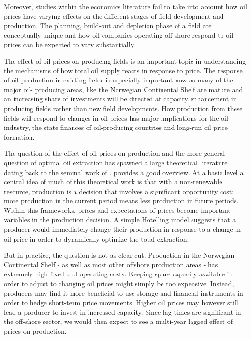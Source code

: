 \documentclass[12pt]{article}
\begin{document}
Moreover, studies within the economics literature fail to take into account how oil prices have varying effects on the different stages of field development and production.  The planning, build-out and depletion phase of a field are conceptually unique and how oil companies operating off-shore respond to oil prices can be expected to vary substantially.

The effect of oil prices on producing fields is an important topic in understanding the mechanisms of how total oil supply reacts in response to price. The response of oil production in existing fields is especially important now as many of the major oil- producing areas, like the Norwegian Continental Shelf are mature and an increasing share of investments will be directed at capacity enhancement in producing fields rather than new field developments. How production from these fields will respond to changes in oil prices has major implications for the oil industry, the state finances of oil-producing countries and long-run oil price formation.

The question of the effect of oil prices on production and the more general question of optimal oil extraction has spawned a large theoretical literature dating back to the seminal work of \citet{hotelling_economics_1931}. \citet{krautkraemer_nonrenewable_1998} provides a good overview. At a basic level a central idea of much of this theoretical work is that with a non-renewable resource, production is a decision that involves a significant opportunity cost: more production in the current period means less production in future periods.  Within this frameworks, prices and expectations of prices become important variables in the production decision. A simple Hotelling model suggests that a producer would immediately change their production in response to a change in oil price in order to dynamically optimize the total extraction.

But in practice, the question is not as clear cut.  Production in the Norwegian Continental Shelf - as well as most other offshore production areas - has extremely high fixed and operating costs.  Keeping spare capacity available in order to adjust to changing oil prices might simply be too expensive.  Instead, producers may find it more beneficial to use storage and financial instruments in order to hedge short-term price movements. Higher oil prices may however still lead a producer to invest in increased capacity.  Since lag times are significant in the off-shore sector, we would then expect to see a multi-year lagged effect of prices on production.  
\end{document}
